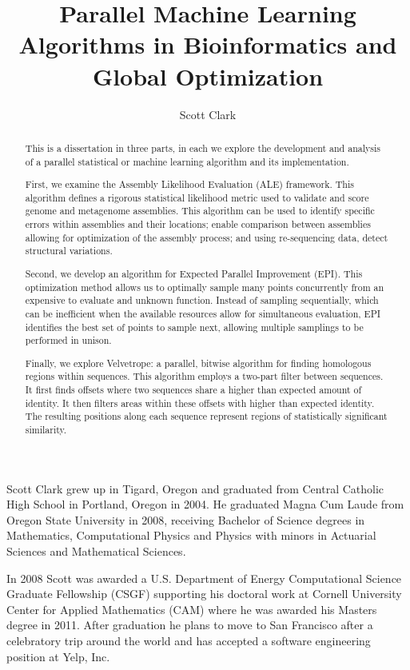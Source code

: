 \documentclass[phd,tocprelim]{cornell}
\title {Parallel Machine Learning Algorithms in Bioinformatics and Global Optimization}
\author {Scott Clark}
\begin{document}
\maketitle
\makecopyright

\begin{abstract}
This is a dissertation in three parts, in each we explore the development and analysis of a parallel statistical or machine learning algorithm and its implementation.

First, we examine the Assembly Likelihood Evaluation (ALE) framework. This algorithm defines a rigorous statistical likelihood metric used to validate and score genome and metagenome assemblies. This algorithm can be used to identify specific errors within assemblies and their locations; enable comparison between assemblies allowing for optimization of the assembly process; and using re-sequencing data, detect structural variations.

Second, we develop an algorithm for Expected Parallel Improvement (EPI). This optimization method allows us to optimally sample many points concurrently from an expensive to evaluate and unknown function. Instead of sampling sequentially, which can be inefficient when the available resources allow for simultaneous evaluation, EPI identifies the best set of points to sample next, allowing multiple samplings to be performed in unison.

Finally, we explore Velvetrope: a parallel, bitwise algorithm for finding homologous regions within sequences. This algorithm employs a two-part filter between sequences. It first finds offsets where two sequences share a higher than expected amount of identity. It then filters areas within these offsets with higher than expected identity. The resulting positions along each sequence represent regions of statistically significant similarity.
\end{abstract}

\begin{biosketch}
Scott Clark grew up in Tigard, Oregon and graduated from Central Catholic High School in Portland, Oregon in 2004. He graduated Magna Cum Laude from Oregon State University in 2008, receiving Bachelor of Science degrees in Mathematics, Computational Physics and Physics with minors in Actuarial Sciences and Mathematical Sciences.

In 2008 Scott was awarded a U.S. Department of Energy Computational Science Graduate Fellowship (CSGF) supporting his doctoral work at Cornell University Center for Applied Mathematics (CAM) where he was awarded his Masters degree in 2011. After graduation he plans to move to San Francisco after a celebratory trip around the world and has accepted a software engineering position at Yelp, Inc.
\end{biosketch}
\end{document}
